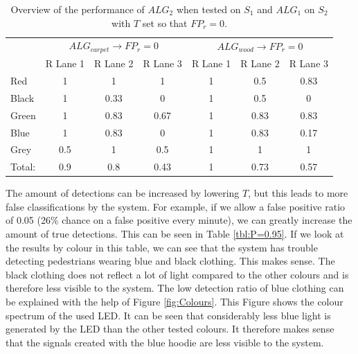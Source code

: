 \begin{table}[]
	\centering	
\begin{tabular}{l|ccc|ccc}
	& \multicolumn{3}{c|}{$ALG_{carpet} \rightarrow FP_r = 0$} & \multicolumn{3}{c}{$ALG_{wood} \rightarrow FP_r = 0$} \\
	& R Lane 1        & R Lane 2        & R Lane 3        & R Lane 1         & R Lane 2        & R Lane 3        \\ \hline
	Red    & 1               & 1               & 1               & 1                & 0.5             & 0.83            \\
	Black  & 1               & 0.33            & 0               & 1                & 0.5             & 0               \\
	Green  & 1               & 0.83            & 0.67            & 1                & 0.83            & 0.83            \\
	Blue   & 1               & 0.83            & 0               & 1                & 0.83            & 0.17            \\
	Grey   & 0.5             & 1               & 0.5             & 1                & 1               & 1               \\ \hline
	Total: & 0.9             & 0.8             & 0.43            & 1                & 0.73            & 0.57           
\end{tabular}
	\caption{Overview of the performance of $ALG_2$ when tested on $S_1$ and $ALG_1$ on $S_2$ with $T$ set so that $FP_r = 0$. \label{tbl:P=1}}
\end{table}

The amount of detections can be increased by lowering $T$, but this leads to more false classifications by the system. For example, if we allow a false positive ratio of 0.05 (26\% chance on a false positive every minute), we can greatly increase the amount of true detections. This can be seen in Table \ref{tbl:P=0.95}. If we look at the results by colour in this table, we can see that the system has trouble detecting pedestrians wearing blue and black clothing. This makes sense. The black clothing does not reflect a lot of light compared to the other colours and is therefore less visible to the system. The low detection ratio of blue clothing can be explained with the help of Figure \ref{fig:Colours}. This Figure shows the colour spectrum of the used LED. It can be seen that considerably less blue light is generated by the LED than the other tested colours. It therefore makes sense that the signals created with the blue hoodie are less visible to the system.

